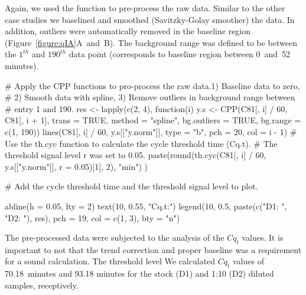 Again, we used the  function to pre-process the raw data. Similar to 
the other case studies we baselined and smoothed (Savitzky-Golay smoother) the 
data. In addition, outliers were automatically removed in the baseline region 
(Figure~\ref{figure:qIA}A~and~B). The background range was defined to be between 
the $1^{th}$ and $190^{th}$ data point (corresponds to baseline region between 
0~and~52 minutes).

\begin{example}
  # Apply the CPP functions to pro-process the raw data.1) Baseline data to zero, 
  # 2) Smooth data with spline, 3) Remove outliers in background range between 
  # entry 1 and 190.
res <- lapply(c(2, 4), function(i) {
  y.s <- CPP(C81[, i] / 60, C81[, i + 1],
             trans = TRUE, 
             method = "spline",
             bg.outliers = TRUE,
             bg.range = c(1, 190))
  lines(C81[, i] / 60, y.s[["y.norm"]], type = "b", pch = 20, col = i - 1)
  # Use the th.cyc function to calculate the cycle threshold time (Cq.t). 
  # The threshold signal level r was set to 0.05.
  paste(round(th.cyc(C81[, i] / 60, y.s[["y.norm"]], r = 0.05)[1], 2), "min")
})

# Add the cycle threshold time and the threshold signal level to plot.

abline(h = 0.05, lty = 2)
text(10, 0.55, "Cq.t:")
legend(10, 0.5, paste(c("D1: ", "D2: "), res), pch = 19, col = c(1, 3), 
       bty = "n")
\end{example}

The pre-processed data were subjected to the analysis of the $Cq_{t}$ values. It 
is important to not that the trend correction and proper baseline was a 
requirement for a sound calculation. The threshold level We calculated $Cq_{t}$ 
values of 70.18~minutes and 93.18 minutes for the stock (D1) and 1:10 (D2) 
diluted samples, receptively.

